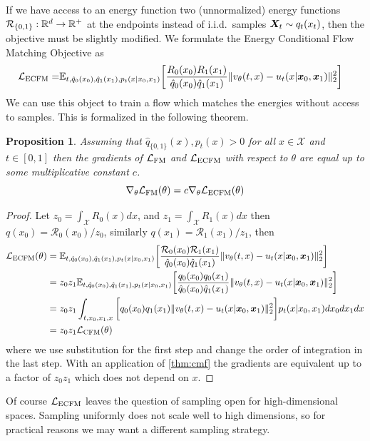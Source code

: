 \documentclass[10pt]{article}
\theoremstyle{plain}
\newtheorem{proposition}[theorem]{Proposition}
\theoremstyle{definition}
\theoremstyle{remark}
\newcommand{\LFM}[0]{\gL_{\rm FM}}
\newcommand{\LCFM}[0]{\gL_{\rm CFM}}
\newcommand{\LECFM}[0]{\gL_{\rm ECFM}}
\begin{document}
If we have access to an energy function two (unnormalized) energy functions $\mathcal{R}_{\{0,1\}} : \mathbb{R}^d \to \mathbb{R}^+$ at the endpoints instead of i.i.d.\ samples ${\bm{X}}_t \sim q_t(x_t)$, then the objective must be slightly modified. We formulate the Energy Conditional Flow Matching Objective as
\begin{align}\label{eq:ecfm}
\LECFM = &\E_{t, \hat{q}_0(x_0), \hat{q}_1(x_1), p_t(x | x_0, x_1)} \bigg [ \frac{R_0(x_0) R_1(x_1)}{\hat{q}_0(x_0) \hat{q}_1(x_1)} \|v_\theta(t, x) - u_t(x | \vx_0, \vx_1)\|^2_2 \bigg ]
\end{align}
We can use this object to train a flow which matches the energies without access to samples. This is formalized in the following theorem. 
\begin{proposition}\label{thm:CFM}
Assuming that $\hat{q}_{\{0,1\}}(x), p_t(x) > 0$ for all $x \in \mathcal{X}$ and $t \in [0, 1]$ then the gradients of $\LFM$ and $\LECFM$ with respect to $\theta$ are equal up to some multiplicative constant $c$.
\begin{equation}
\nabla_\theta \LFM(\theta) = c \nabla_\theta \LECFM(\theta)
\end{equation}
\end{proposition}
\begin{proof}
Let $z_0 = \int_\mathcal{X} R_0(x) dx$, and $z_1 = \int_\mathcal{X} R_1(x) dx$ then $q(x_0) = \mathcal{R}_0(x_0) / z_0$, similarly $q(x_1) = \mathcal{R}_1(x_1) / z_1$, then
\begin{align}\label{eq:gradecfm}
\LECFM(\theta) &= \E_{t, \hat{q}_0(x_0), \hat{q}_1(x_1), p_t(x | x_0, x_1)} \bigg [ \frac{\mathcal{R}_0(x_0) \mathcal{R}_1(x_1)}{\hat{q}_0(x_0) \hat{q}_1(x_1)} \|v_\theta(t, x) - u_t(x | \vx_0, \vx_1)\|^2_2 \bigg ]\\
&= z_0 z_1 \E_{t, \hat{q}_0(x_0), \hat{q}_1(x_1), p_t(x | x_0, x_1)} \bigg [ \frac{q_0(x_0) q_0(x_1)}{\hat{q}_0(x_0) \hat{q}_1(x_1)} \|v_\theta(t, x) - u_t(x | \vx_0, \vx_1)\|^2_2 \bigg ]\\
&= z_0 z_1 \int_{t, x_0, x_1, x} \bigg [ q_0(x_0) q_1(x_1)\|v_\theta(t, x) - u_t(x | \vx_0, \vx_1)\|^2_2 \bigg ] p_t(x | x_0, x_1) d x_0 d x_1 dx \\
&= z_0 z_1 \LCFM(\theta)
\end{align}
where we use substitution for the first step and change the order of integration in the last step. With an application of \autoref{thm:cmf} the gradients are equivalent up to a factor of $z_0 z_1$ which does not depend on $x$.
\end{proof}
Of course $\LECFM$ leaves the question of sampling open for high-dimensional spaces. Sampling uniformly does not scale well to high dimensions, so for practical reasons we may want a different sampling strategy.
\end{document}

